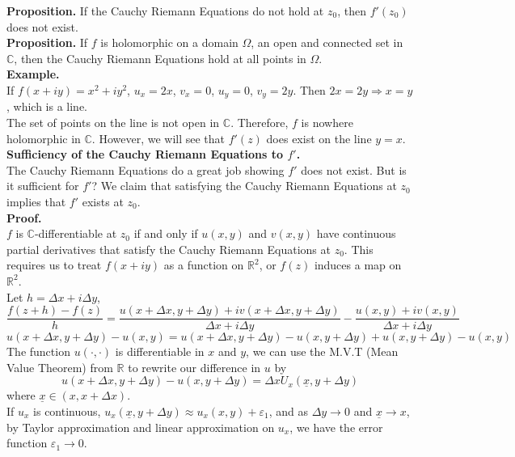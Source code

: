 \documentclass[11pt]{article}
\begin{document}
\textbf{Proposition.} If the Cauchy Riemann Equations do not hold at $z_0$, then $f'(z_0)$ does not exist. \\
\textbf{Proposition.} If $f$ is holomorphic on a domain $\Omega$, an open and connected set in $\mathbb{C}$, then the Cauchy Riemann Equations hold at all points in $\Omega$. \\
\newline
\textbf{Example.} \\
If $f(x + iy) = x^2 + iy^2$, $u_x = 2x$, $v_x = 0$, $u_y = 0$, $v_y = 2y$. Then $2x = 2y \Rightarrow x = y$, which is a line. \\
The set of points on the line is not open in $\mathbb{C}$. Therefore, $f$ is nowhere holomorphic in $\mathbb{C}$. However, we will see that $f'(z)$ does exist on the line $y = x$. \\
\newline
\textbf{Sufficiency of the Cauchy Riemann Equations to $f'$.} \\
The Cauchy Riemann Equations do a great job showing $f'$ does not exist. But is it sufficient for $f'$? We claim that satisfying the Cauchy Riemann Equations at $z_0$ implies that $f'$ exists at $z_0$. \\
\textbf{Proof.} \\
$f$ is $\mathbb{C}$-differentiable at $z_0$ if and only if $u(x, y)$ and $v(x, y)$ have continuous partial derivatives that satisfy the Cauchy Riemann Equations at $z_0$. 
This requires us to treat $f(x + iy)$ as a function on $\mathbb{R} ^ 2$, or $f(z)$ induces a map on $\mathbb{R} ^ 2$. \\
Let $ h = \Delta x + i\Delta y$, 
$$ \frac{f(z + h) - f(z)}{h} = \frac{u(x + \Delta x, y + \Delta y) + iv(x + \Delta x, y + \Delta y)}{\Delta x + i \Delta y} - \frac{u(x, y) + iv(x, y)}{\Delta x + i \Delta y}$$
$$u(x + \Delta x, y + \Delta y) - u(x, y) = u(x + \Delta x, y + \Delta y) - u(x, y + \Delta y) + u(x, y + \Delta y) - u(x, y)$$ 
The function $u(\cdot, \cdot)$ is differentiable in $x$ and $y$, we can use the M.V.T (Mean Value Theorem) from $\mathbb{R}$ to rewrite our difference in $u$ by \\
$$u(x + \Delta x, y + \Delta y) - u(x, y + \Delta y) = \Delta xU_x(\underline x, y + \Delta y)$$
where $\underline x \in (x, x + \Delta x)$. \\
\newline 
If $u_x$ is continuous, $u_x(\underline x, y + \Delta y) \approx u_x(x, y) + \varepsilon_1$, and as $\Delta y \to 0$ and $\underline x \to x$, by Taylor approximation and linear approximation on $u_x$, we have the error function $\varepsilon_1 \to 0$. \\
\end{document}
